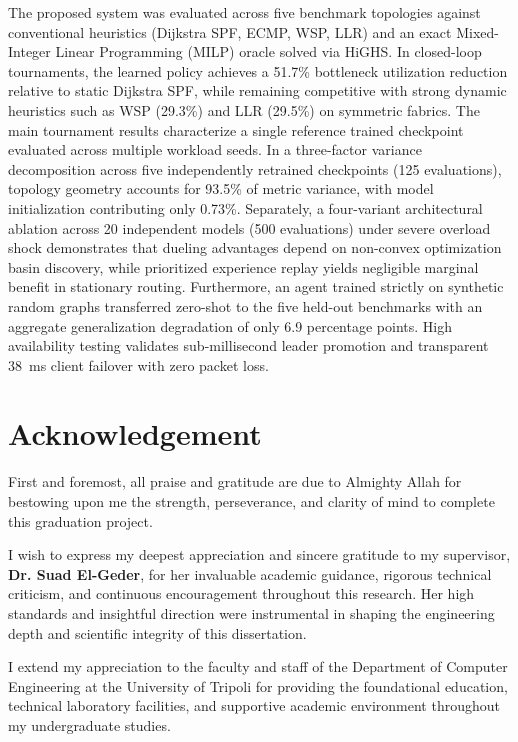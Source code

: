 \documentclass[12pt,a4paper,oneside]{report}
\begin{document}
The proposed system was evaluated across five benchmark topologies against conventional heuristics (Dijkstra SPF, ECMP, WSP, LLR) and an exact Mixed-Integer Linear Programming (MILP) oracle solved via HiGHS. In closed-loop tournaments, the learned policy achieves a 51.7\% bottleneck utilization reduction relative to static Dijkstra SPF, while remaining competitive with strong dynamic heuristics such as WSP (29.3\%) and LLR (29.5\%) on symmetric fabrics. The main tournament results characterize a single reference trained checkpoint evaluated across multiple workload seeds. In a three-factor variance decomposition across five independently retrained checkpoints (125 evaluations), topology geometry accounts for 93.5\% of metric variance, with model initialization contributing only 0.73\%. Separately, a four-variant architectural ablation across 20 independent models (500 evaluations) under severe overload shock demonstrates that dueling advantages depend on non-convex optimization basin discovery, while prioritized experience replay yields negligible marginal benefit in stationary routing. Furthermore, an agent trained strictly on synthetic random graphs transferred zero-shot to the five held-out benchmarks with an aggregate generalization degradation of only 6.9 percentage points. High availability testing validates sub-millisecond leader promotion and transparent 38~ms client failover with zero packet loss.

\chapter*{Acknowledgement}
First and foremost, all praise and gratitude are due to Almighty Allah for bestowing upon me the strength, perseverance, and clarity of mind to complete this graduation project.

I wish to express my deepest appreciation and sincere gratitude to my supervisor, \textbf{Dr. Suad El-Geder}, for her invaluable academic guidance, rigorous technical criticism, and continuous encouragement throughout this research. Her high standards and insightful direction were instrumental in shaping the engineering depth and scientific integrity of this dissertation.

I extend my appreciation to the faculty and staff of the Department of Computer Engineering at the University of Tripoli for providing the foundational education, technical laboratory facilities, and supportive academic environment throughout my undergraduate studies.
\end{document}
